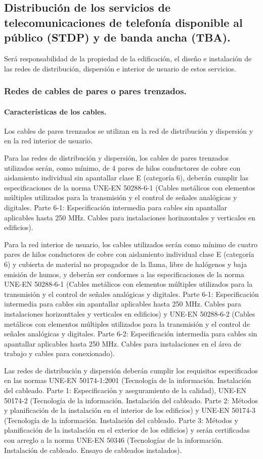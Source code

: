 \subsection{Distribución de los servicios de telecomunicaciones de telefonía disponible al público (STDP) y de banda ancha (TBA).}
Será responsabilidad de la propiedad de la edificación, el diseño e instalación de las redes de distribución, dispersión e interior de usuario de estos servicios.
\subsubsection{Redes de cables de pares o pares trenzados.}
\paragraph{Características de los cables.}
Los cables de pares trenzados se utilizan en la red de distribución y dispersión y en la red interior de usuario.

Para las redes de distribución y dispersión, los cables de pares trenzados utilizados serán, como mínimo, de 4 pares de hilos conductores de cobre con aislamiento individual sin apantallar clase E (categoría 6), deberán cumplir las especificaciones de la norma UNE-EN 50288-6-1 (Cables metálicos con elementos múltiples utilizados para la transmisión y el control de señales analógicas y digitales. Parte 6-1: Especificación intermedia para cables sin apantallar aplicables hasta 250 MHz. Cables para instalaciones horinzontales y verticales en edificios).

Para la red interior de usuario, los cables utilizados serán como mínimo de cuatro pares de hilos conductores de cobre con aislamiento individual clase E (categoría 6) y cubierta de material no propagador de la llama, libre de halógenos y baja emisión de humos, y deberán ser conformes a las especificaciones de la norma UNE-EN 50288-6-1 (Cables metálicos con elementos múltiples utilizados para la transmisión y el control de señales analógicas y digitales. Parte 6-1: Especificación intermedia para cables sin apantallar aplicables hasta 250 MHz. Cables para instalaciones horizonttales y verticales en edificios) y UNE-EN 50288-6-2 (Cables metálicos con elementos múltiples utilizados para la transmisión y el control de señales analógicas y digitales. Parte 6-2: Especificación intermedia para cables sin apantallar aplicables hasta 250 MHz. Cables para instalaciones en el área de trabajo y cables para conexionado). 

Las redes de distribución y dispersión deberán cumplir los requisitos especificados en las normas UNE-EN 50174-1:2001 (Tecnología de la información. Instalación del cableado. Parte 1: Especificación y aseguramiento de la calidad), UNE-EN 50174-2 (Tecnología de la información. Instalación del cableado. Parte 2: Métodos y planificación de la instalación en el interior de los edificios) y UNE-EN 50174-3 (Tecnología de la información. Instalación del cableado. Parte 3: Métodos y planificación de la instalación en el exterior de los edificios) y serán certificadas con arreglo a la norma UNE-EN 50346 (Tecnologías de la información. Instalación de cableado. Ensayo de cableados instalados).


